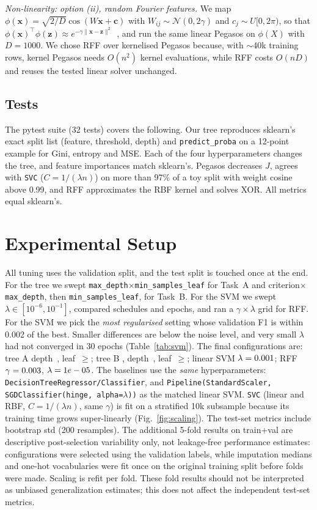 \documentclass[10pt,twocolumn,a4paper]{article}
\begin{document}
\emph{Non-linearity: option (ii), random Fourier features.} We map
$\phi(\mathbf{x})=\sqrt{2/D}\cos(W\mathbf{x}+\mathbf{c})$ with $W_{ij}\sim\mathcal N(0,2\gamma)$ and
$c_j\sim U[0,2\pi)$, so that $\phi(\mathbf{x})^\top\phi(\mathbf{z})\approx e^{-\gamma\lVert\mathbf{x}-\mathbf{z}\rVert^2}$~\cite{rff},
and run the same linear Pegasos on $\phi(X)$ with $D=1000$. We chose RFF over kernelised Pegasos because, with
$\sim$40k training rows, kernel Pegasos needs $O(n^2)$ kernel evaluations, while RFF costs $O(nD)$ and reuses
the tested linear solver unchanged.

\subsection{Tests}
The pytest suite (32 tests) covers the following. Our tree reproduces sklearn's exact split list
(feature, threshold, depth) and \texttt{predict\_proba} on a 12-point example for Gini, entropy and MSE.
Each of the four hyperparameters changes the tree, and feature importances match sklearn's. Pegasos decreases $J$,
agrees with \texttt{SVC} ($C=1/(\lambda n)$) on more than 97\% of a toy split with weight cosine above 0.99, and RFF approximates the
RBF kernel and solves XOR. All metrics equal sklearn's.

\section{Experimental Setup}
All tuning uses the validation split, and the test split is touched once at the end. For the tree we swept
\texttt{max\_depth}$\times$\texttt{min\_samples\_leaf} for Task~A and criterion$\times$\texttt{max\_depth}, then
\texttt{min\_samples\_leaf}, for Task~B. For the SVM we swept $\lambda\in[10^{-6},10^{-1}]$, compared schedules and epochs,
and ran a $\gamma\times\lambda$ grid for RFF. For the SVM we pick the \emph{most regularised} setting whose
validation F1 is within 0.002 of the best. Smaller differences are below the noise level, and very small $\lambda$
had not converged in 30 epochs (Table~\ref{tab:svm}). The final configurations are:
tree A depth~\TreeADepth, leaf~$\ge$\TreeALeaf; tree B \TreeBCrit, depth~\TreeBDepth, leaf~$\ge$\TreeBLeaf;
linear SVM $\lambda=0.001$; RFF $\gamma=0.003$, $\lambda=1e-05$.
The baselines use the \emph{same} hyperparameters: \texttt{DecisionTreeRegressor/Classifier}, and
\texttt{Pipeline(StandardScaler, SGDClassifier(hinge, alpha=}$\lambda$\texttt{))} as the matched linear SVM.
\texttt{SVC} (linear and RBF, $C=1/(\lambda n)$, same $\gamma$) is fit on a stratified 10k subsample because its
training time grows super-linearly (Fig.~\ref{fig:scaling}). The test-set metrics include bootstrap std
(200 resamples). The additional 5-fold results on train+val are descriptive post-selection variability only,
not leakage-free performance estimates: configurations were selected using the validation labels, while
imputation medians and one-hot vocabularies were fit once on the original training split before folds were made.
Scaling is refit per fold. These fold results should not be interpreted as unbiased generalization estimates;
this does not affect the independent test-set metrics.
\end{document}
